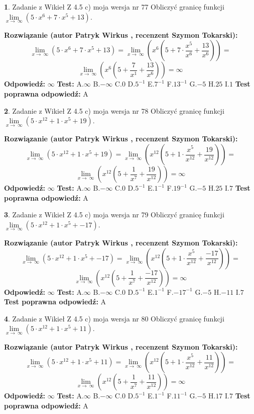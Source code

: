 \documentclass[12pt, a4paper]{article}
\theoremstyle{definition} %
\newtheorem{zad}{}
\newcommand{\zadStart}[1]{\begin{zad}#1\newline}
\newcommand{\zadStop}{\end{zad}}
\newcommand{\rozwStart}[2]{\noindent \textbf{Rozwiązanie (autor #1 , recenzent #2): }\newline}
\newcommand{\rozwStop}{\newline}
\newcommand{\odpStart}{\noindent \textbf{Odpowiedź:}\newline}
\newcommand{\odpStop}{\newline}
\newcommand{\testStart}{\noindent \textbf{Test:}\newline}
\newcommand{\testStop}{\newline}
\newcommand{\kluczStart}{\noindent \textbf{Test poprawna odpowiedź:}\newline}
\newcommand{\kluczStop}{\newline}
\begin{document}
\zadStart{Zadanie z Wikieł Z 4.5 c) moja wersja nr 77}
Obliczyć granicę funkcji  $\lim\limits_{x\to\ \infty}(5 \cdot x^{6}+7 \cdot x^{5}+13)$.
\zadStop
\rozwStart{Patryk Wirkus}{Szymon Tokarski}
$$\lim\limits_{x\to\ \infty}(5 \cdot x^{6}+7 \cdot x^{5}+13) = \lim\limits_{x\to\ \infty}(x^{6}(5 +7 \cdot \frac{x^{5}}{x^{6}}+\frac{13}{x^{6}})) =$$ $$\lim\limits_{x\to\ \infty}(x^{6}(5 +\frac{7}{x^{1}}+\frac{13}{x^{6}})) =\infty$$
\rozwStop
\odpStart
$\infty$
\odpStop
\testStart
A.$\infty$ B.$-\infty$ C.$0$ D.$5^{-1}$ E.$7^{-1}$
F.$13^{-1}$ G.$-5$
H.$25$
I.$1$
\testStop
\kluczStart
A
\kluczStop



\zadStart{Zadanie z Wikieł Z 4.5 c) moja wersja nr 78}
Obliczyć granicę funkcji  $\lim\limits_{x\to\ \infty}(5 \cdot x^{12}+1 \cdot x^{5}+19)$.
\zadStop
\rozwStart{Patryk Wirkus}{Szymon Tokarski}
$$\lim\limits_{x\to\ \infty}(5 \cdot x^{12}+1 \cdot x^{5}+19) = \lim\limits_{x\to\ \infty}(x^{12}(5 +1 \cdot \frac{x^{5}}{x^{12}}+\frac{19}{x^{12}})) =$$ $$\lim\limits_{x\to\ \infty}(x^{12}(5 +\frac{1}{x^{7}}+\frac{19}{x^{12}})) =\infty$$
\rozwStop
\odpStart
$\infty$
\odpStop
\testStart
A.$\infty$ B.$-\infty$ C.$0$ D.$5^{-1}$ E.$1^{-1}$
F.$19^{-1}$ G.$-5$
H.$25$
I.$7$
\testStop
\kluczStart
A
\kluczStop



\zadStart{Zadanie z Wikieł Z 4.5 c) moja wersja nr 79}
Obliczyć granicę funkcji  $\lim\limits_{x\to\ \infty}(5 \cdot x^{12}+1 \cdot x^{5}+-17)$.
\zadStop
\rozwStart{Patryk Wirkus}{Szymon Tokarski}
$$\lim\limits_{x\to\ \infty}(5 \cdot x^{12}+1 \cdot x^{5}+-17) = \lim\limits_{x\to\ \infty}(x^{12}(5 +1 \cdot \frac{x^{5}}{x^{12}}+\frac{-17}{x^{12}})) =$$ $$\lim\limits_{x\to\ \infty}(x^{12}(5 +\frac{1}{x^{7}}+\frac{-17}{x^{12}})) =\infty$$
\rozwStop
\odpStart
$\infty$
\odpStop
\testStart
A.$\infty$ B.$-\infty$ C.$0$ D.$5^{-1}$ E.$1^{-1}$
F.$-17^{-1}$ G.$-5$
H.$-11$
I.$7$
\testStop
\kluczStart
A
\kluczStop



\zadStart{Zadanie z Wikieł Z 4.5 c) moja wersja nr 80}
Obliczyć granicę funkcji  $\lim\limits_{x\to\ \infty}(5 \cdot x^{12}+1 \cdot x^{5}+11)$.
\zadStop
\rozwStart{Patryk Wirkus}{Szymon Tokarski}
$$\lim\limits_{x\to\ \infty}(5 \cdot x^{12}+1 \cdot x^{5}+11) = \lim\limits_{x\to\ \infty}(x^{12}(5 +1 \cdot \frac{x^{5}}{x^{12}}+\frac{11}{x^{12}})) =$$ $$\lim\limits_{x\to\ \infty}(x^{12}(5 +\frac{1}{x^{7}}+\frac{11}{x^{12}})) =\infty$$
\rozwStop
\odpStart
$\infty$
\odpStop
\testStart
A.$\infty$ B.$-\infty$ C.$0$ D.$5^{-1}$ E.$1^{-1}$
F.$11^{-1}$ G.$-5$
H.$17$
I.$7$
\testStop
\kluczStart
A
\kluczStop
\end{document}

